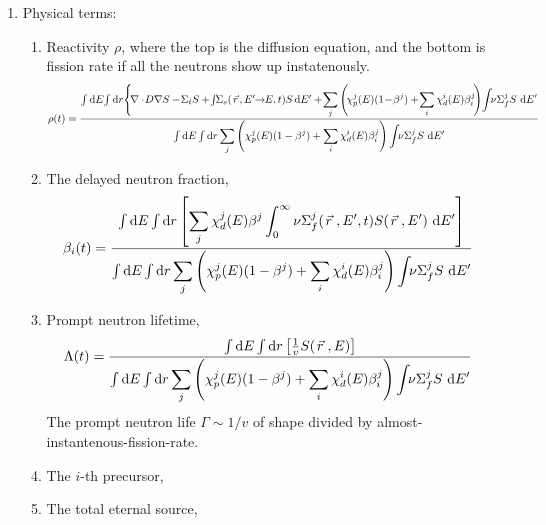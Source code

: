 \documentclass{school-22.211-notes}
\begin{document}
\begin{enumerate}
\begin{enumerate}
    \item Physical terms: 
      \begin{enumerate}
      \item Reactivity $\rho$, where the top is the diffusion equation, and the bottom is fission rate if all the neutrons show up instatenously. 
        \scriptsize
        \begin{align}
          \rho (t) &= \frac{\int \bsp \dE \! \int \bsp \dr \Bigg\{ \!\divergence \! D  \gradient S  - \! \Sigma_t S  + \! \int \bsp \Sigma_s (\vecr \!, E' \bsp \to \bsp E, t) S \! \dE'   
            + \! \Sum_j \left( \! \chi_p^j (E) (1 \! - \! \beta^j) +  \! \Sum_i \chi_d^i (E) \beta_i^j \! \right) \! \int \bsp \nu \Sigma_f^j  S \dE'  }{\int \bsp \dE \int \bsp \dr \Sum_j \left( \chi_p^j (E) (1-\beta^j) + \Sum_i \chi_d^i (E) \beta_i^j \right) \int \bsp \nu \Sigma_f^j S \dE'} 
        \end{align}
        \normalsize

      \item The delayed neutron fraction, 
        \begin{align}
          \beta_i (t) &= \frac{\int \bsp \dE \int \bsp \dr \left[ \Sum_j \chi_d^j (E) \beta^j \int_0^{\infty} \nu \Sigma_f^j (\vecr, E', t) S(\vecr, E') \dE' \right] }{\int \bsp \dE \int \bsp \dr \Sum_j \left( \chi_p^j (E) (1-\beta^j) + \Sum_i \chi_d^i (E) \beta_i^j \right) \int \bsp \nu \Sigma_f^j S \dE'} 
        \end{align}

      \item Prompt neutron lifetime, 
        \begin{align}
          \Lambda (t) &= \frac{\int \bsp \dE \int \bsp  \dr \left[ \frac{1}{v} S(\vecr, E) \right] }{\int \bsp \dE \int \bsp \dr \Sum_j \left( \chi_p^j (E) (1-\beta^j) + \Sum_i \chi_d^i (E) \beta_i^j \right) \int \bsp \nu \Sigma_f^j S \dE'} 
        \end{align}
        The prompt neutron life $\Gamma \sim 1/v$ of shape divided by almost-instantenous-fission-rate. 
      \item The $i$-th precursor, 
      \item The total eternal source, 
      \end{enumerate}



\end{enumerate}
\end{enumerate}
\end{document}
